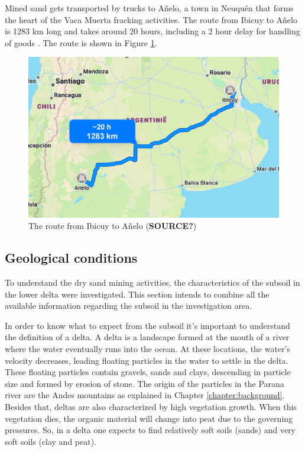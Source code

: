 Mined sand gets transported by trucks to Añelo, a town in Neuquén that forms the heart of the Vaca Muerta fracking activities. The route from Ibicuy to Añelo is 1283 km long and takes around 20 hours, including a 2 hour delay for handling of goods \autocite{secretariadepoliticamineraArenasParaFracking2019}. The route is shown in Figure \ref{fig:sandroute}. 

\begin{figure}[H]
    \centering
    \includegraphics[width=0.6\linewidth]{figures/ch9/Routesand.png}
    \caption{The route from Ibicuy to Añelo (\textbf{SOURCE?})}
    \label{fig:sandroute}
\end{figure}

\subsection{Geological conditions} \label{par:geology}
To understand the dry sand mining activities, the characteristics of the subsoil in the lower delta were investigated. This section intends to combine all the available information regarding the subsoil in the investigation area.

In order to know what to expect from the subsoil it's important to understand the definition of a delta. A delta is a landscape formed at the mouth of a river where the water eventually runs into the ocean. At these locations, the water's velocity decreases, leading floating particles in the water to settle in the delta. These floating particles contain gravels, sands and clays, descending in particle size and formed by erosion of stone. The origin of the particles in the Parana river are the Andes mountains as explained in Chapter \ref{chapter:background}. 
Besides that, deltas are also characterized by high vegetation growth. When this vegetation dies, the organic material will change into peat due to the governing pressures. So, in a delta one expects to find relatively soft soils (sands) and very soft soils (clay and peat).

